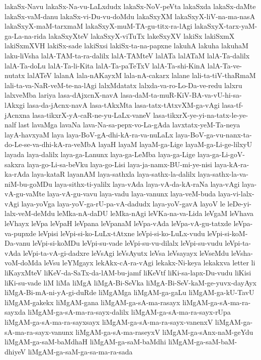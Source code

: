 {lakaSx-Navu
lakaSx-Na-vu-LaLxdudx
lakaSx-NoV-peVta
lakaSxda
lakaSx-daMte
lakaSx-vaM-danu
lakaSx-vi-Du-vu-doMdu
lakaSxyXM
lakaSxyX-liV-na-ma-nasA
lakaSxyX-maM-tarxmaM
lakaSxyX-muM-TA-gu-titx-ra-lAgi
lakaSxyX-tarx-yaM-ga-La-na-rida
lakaSxyXteV
lakaSxyX-viTuTx
lakeSxyXV
lakiSx
lakiSxmX
lakiSxmXVH
lakiSx-sade
lakiSxsi
lakiSx-ta-na-papxne
lakuhA
lakuha
lakuhaM
laku-liVsha
lalA-TAM-ta-ra-dalilx
lalA-TAMteV
lalATa
lalATaM
lalA-Ta-dalilx
lalA-Ta-doLu
lalA-Ta-li-Kita
lalA-Ta-paTeTxV
lalA-Ta-shi-KinA
lalA-Ta-ve-nutatx
lalATeV
lalanA
lala-nAKayxM
lala-nA-cakarx
lalane
lali-ta-tiV-thaRmaM
lali-ta-va-NaR-veM-te-na-lAgi
lalxMdatatx
lalxda-va-ro-Lo-Da-ve-redu
lalxru
lalxveMba
lariya
lasa-dAjxcnX-navA
lasa-daM-ta-muR-KiV-BA-va-vU-hi-sa-lAkxgi
lasa-da-jAcnx-navA
lasa-tAkxMta
lasa-tatx-tAtxvXM-ga-vAgi
lasa-tf-jAcnxna
lasa-tikxrX-yA-caR-ne-yu-LaLx-vaneV
lasa-tikxrX-ye-yi-na-tatx-le-ye-nalf
last
lavaMga
lavaNa
lava-Na-sa-pepx-vo-La-gAda
lavxtatx-yeM-Ta-neya
layA-havxyaM
laya
laya-BoV-gA-dhi-kA-ra-va-nuLaLx
laya-BoV-ga-vu-nanx-ta-do-Le-se-va-dhi-kA-ra-veMbA
layaH
layaM
layaM-ga-Lige
layaM-ga-Li-ge-lilxyU
layada
laya-dalilx
laya-ga-Lanunx
laya-ga-LeMba
laya-ga-Lige
laya-ga-Li-goV-sakxra
laya-go-Li-sa-beVku
laya-go-Lisi
laya-ja-namx-BU-mi-ye-nisi
laya-kA-ra-ka-rAda
laya-kataR
layanAM
laya-sathxla
laya-sathx-la-dalilx
laya-sathx-la-va-niM-bu-goMDu
laya-sithx-ti-yalilx
laya-vAda
laya-vA-da-kA-raNa
laya-vAgi
laya-vA-gu-vaMte
laya-vA-gu-vavu
laya-vadu
laya-vanunx
laya-veM-buda
laya-vi-lalx-vAgi
laya-yoVga
laya-yoV-ga-rU-pa-vA-dadudx
laya-yoV-gavA
layoV
le
leDe-yi-lalx-veM-deMdu
leMka-nA-daDU
leMka-nAgi
leVKa-na-va-Lida
leVgaM
leVhava
leVhayx
leVpa
leVpaH
leVpana
leVpanaM
leVpa-vAda
leVpa-vA-gu-tatxde
leVpa-va-pupxde
leVpisi
leVpi-si-ko-LuLx-tAtxne
leVpi-si-ko-LuLx-vudu
leVpi-si-koM-Da-vanu
leVpi-si-koMDu
leVpi-su-vade
leVpi-su-vu-dilalx
leVpi-su-vudu
leVpi-ta-vAda
leVpi-ta-vA-gi-dadxre
leVsAgi
leVsAyutx
leVsa
leVsayayx
leVseMdu
leVsha-voM-doMda
leVsu
leYMgayx
lekAkx-cA-ra-vAgi
lekakx-Ni-keya
lekakxva
letter
li
liKayxMteV
liKeV-da-SaTx-da-lAM-bu-jamf
liKeVtf
liKi-sa-lapx-Du-vudu
liKisi
liKi-su-vade
liM
liMa
liMgA
liMgA-Bi-SeVka
liMgA-Bi-SeV-kaM-ge-yuvx-dayAyx
liMgA-Bi-mA-ni-yA-gi-duRde
liMgAMga
liMgAM-ga-gaLu
liMgAM-ga-kU-TavU
liMgAM-gakekx
liMgAM-gana
liMgAM-ga-sA-ma-rasayx
liMgAM-ga-sA-ma-ra-sayxda
liMgAM-ga-sA-ma-ra-sayx-dalilx
liMgAM-ga-sA-ma-ra-sayx-rUpa
liMgAM-ga-sA-ma-ra-sayxsayx
liMgAM-ga-sA-ma-ra-sayx-vanenxV
liMgAM-ga-sA-ma-ra-sayx-vanunx
liMgAM-ga-sA-ma-raseyxV
liMgAM-ga-sAnx-naM-geYdu
liMgAM-ga-saM-baMdhaH
liMgAM-ga-saM-baMdhi
liMgAM-ga-saM-baM-dhiyeV
liMgAM-ga-saM-ga-sa-ma-ra-sada
}

